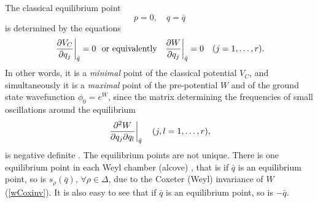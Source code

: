 \documentclass[a4paper,12pt]{article}
\begin{document}
The classical equilibrium point
\begin{equation}
   p=0,\quad q=\bar{q}
   \label{clasequil}
\end{equation}
is determined by the equations \cite{cs}
\begin{equation}
   \left.{\partial V_C\over{\partial q_j}}\right|_{\bar{q}}=0
   \mbox{~~or equivalently~~}
   \left.{\partial W\over{\partial q_j}}\right|_{\bar{q}}=0\quad(j=1,\ldots,r).
   \label{Wmax}
\end{equation}
In other words, it is a {\em minimal\/} point of the classical
potential $V_C$, and simultaneously it is a {\em maximal\/} point of
the pre-potential $W$ and of the ground state  wavefunction $\phi_0=e^W$,
since the matrix determining the frequencies of small oscillations around
the equilibrium
\begin{equation}
   \left.{\partial^2 W\over{\partial q_j \partial q_l}}\right|_{\bar{q}}
   \quad (j,l=1,\ldots, r),
   \label{wpp}
\end{equation}
is negative definite \cite{cs}.
The equilibrium points are not unique.
There is one equilibrium point in each Weyl chamber (alcove) \cite{cs},
that is if $\bar{q}$ is an equilibrium point, so is $s_\rho(\bar{q})$,
$\forall\rho\in\Delta$, due to the Coxeter (Weyl) invariance of $W$
(\ref{wCoxinv}). It is also easy to see that if $\bar{q}$ is an
equilibrium point, so is $-\bar{q}$.
\end{document}
